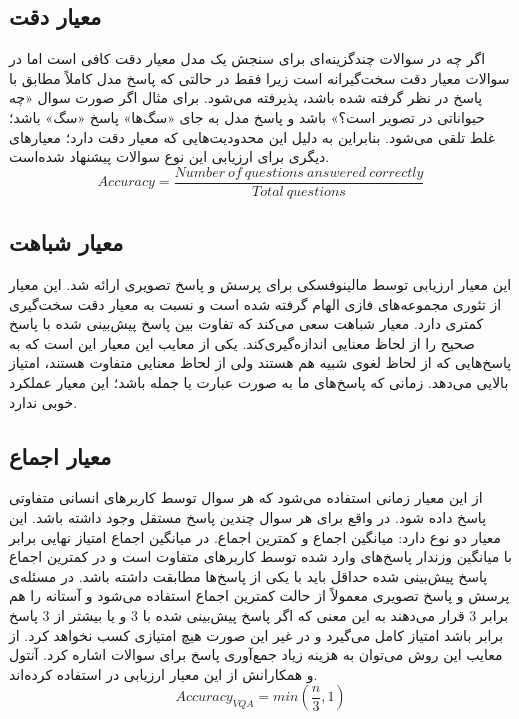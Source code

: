\subsection{معیار دقت}

		اگر چه در سوالات چندگزینه‌ای برای سنجش یک مدل معیار دقت کافی است اما در سوالات 
		معیار دقت سخت‌گیرانه است زیرا فقط در حالتی که پاسخ مدل کاملاً مطابق با پاسخ در نظر گرفته شده باشد، پذیرفته می‌‌شود. برای مثال اگر صورت سوال «چه حیواناتی در تصویر است؟» باشد و پاسخ مدل به جای «سگ‌ها‌» پاسخ «سگ» باشد؛ غلط تلقی می‌شود. بنابراین به دلیل این محدودیت‌هایی که معیار دقت دارد؛ معیارهای دیگری برای ارزیابی این نوع سوالات پیشنهاد‌ شده‌است.
		\begin{equation}
		Accuracy = \frac{Number \ of \ questions \ answered \ correctly}{Total \ questions}
		\end{equation}

	
\subsection[معیار شباهت \lr{Wu-Palmer}]{معیار شباهت \cite{wu1994verb}}
	این معیار ارزیابی توسط مالینوفسکی 
	\cite{malinowski2014multi}
	برای پرسش و پاسخ تصویری ارائه شد. این معیار از تئوری مجموعه‌های فازی الهام گرفته شده است و نسبت به معیار دقت سخت‌گیری کمتری دارد. معیار شباهت 
	سعی می‌کند که تفاوت بین پاسخ پیش‌بینی شده با پاسخ صحیح  را از لحاظ معنایی اندازه‌گیری‌کند. یکی از معایب این معیار این است که به پاسخ‌هایی که از لحاظ لغوی شبیه هم هستند ولی از لحاظ معنایی متفاوت هستند، امتیاز بالایی می‌دهد. زمانی که پاسخ‌های ما به صورت عبارت یا جمله باشد؛ این  معیار عملکرد خوبی ندارد. 

\subsection{معیار اجماع}

		از این معیار زمانی استفاده می‌شود که هر سوال توسط کاربرهای انسانی متفاوتی پاسخ داده شود. در واقع برای هر سوال چندین پاسخ مستقل وجود داشته باشد. این معیار دو نوع دارد: میانگین اجماع و کمترین اجماع. در میانگین اجماع امتیاز نهایی برابر با میانگین وزندار پاسخ‌های وارد شده توسط کاربرهای متفاوت است و در کمترین اجماع پاسخ پیش‌بینی شده حداقل باید با یکی از پاسخ‌ها مطابقت داشته باشد. در مسئله‌ی پرسش و پاسخ تصویری معمولاً از حالت کمترین اجماع استفاده می‌شود و آستانه را هم برابر 3 قرار می‌دهند به این معنی که اگر پاسخ پیش‌بینی شده با 3 و یا بیشتر از 3 پاسخ برابر باشد امتیاز کامل می‌گیرد و در غیر این صورت هیچ امتیازی کسب نخواهد کرد. از معایب این روش می‌توان به هزینه زیاد جمع‌آوری پاسخ برای سوالات اشاره کرد. آنتول و همکارانش از این معیار ارزیابی در 
		\cite{antol2015vqa}
		استفاده کرده‌اند.
		\begin{equation}
			Accuracy_{VQA} = min(\frac{n}{3}, 1)
		\end{equation}


